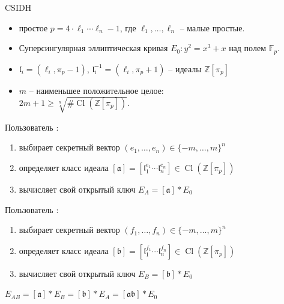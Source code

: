 \documentclass{beamer}
\begin{document}
\begin{frame}{CSIDH}
	\begin{itemize}
		\item простое $p=4\cdot \ell_1 \cdots \ell_n - 1$, где $\ell_1, \ldots, \ell_n$ -- малые простые.
		\item Суперсингулярная эллиптическая кривая $E_0: y^2=x^3+x$ над полем $\mathbb{F}_p$.
		\item $\mathfrak{l}_i=(\ell_i, \pi_p-1)$, $\mathfrak{l}_i^{-1}=(\ell_i, \pi_p+1)$ -- идеалы $\mathbb{Z}[\pi_p]$
		\item $m$ -- наименьшее положительное целое:\\$2m+1 \geq \sqrt[n]{\# \operatorname{Cl}(\mathbb{Z}[\pi_p])}$.
	\end{itemize}
\end{frame}

\begin{frame}
	
	\vspace{1em}
	Пользователь \UserA:
	\begin{enumerate}
		\item выбирает секретный вектор $(e_1, \ldots, e_n) \in \lbrace -m,\ldots ,m \rbrace ^n$
		\item определяет класс идеала $[\mathfrak{a}]=[\mathfrak{l}_1^{e_1}\cdots \mathfrak{l}_n^{e_n}]\in \operatorname{Cl}(\mathbb{Z}[\pi_p])$%
		\item вычисляет свой открытый ключ $E_A = [\mathfrak{a}]*E_0$
	\end{enumerate}
	
	\vspace{1em}
	Пользователь \UserB:
	
	\begin{enumerate}
		\item выбирает секретный вектор $(f_1,\ldots ,f_n) \in \lbrace -m,\ldots ,m \rbrace ^n$
		\item определяет класс идеала $[\mathfrak{b}]=[\mathfrak{l}_1^{f_1}\cdots \mathfrak{l}_n^{f_n}]\in \operatorname{Cl}(\mathbb{Z}[\pi_p])$
		\item вычисляет свой открытый ключ $E_B = [\mathfrak{b}]*E_0$
	\end{enumerate}
	
	\vspace{1em}
	 $E_{AB} = [\mathfrak{a}] * E_B = [\mathfrak{b}] * E_A = [\mathfrak{a}\mathfrak{b}] * E_0$
\end{frame}
\end{document}
